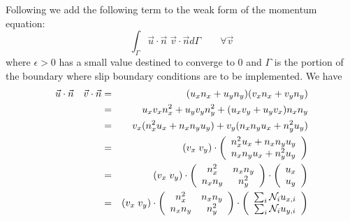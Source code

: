 Following \textcite{diur15} we add the following term to the weak form 
of the momentum equation:
\[
\int_\Gamma \vec{u}\cdot \vec{n} \; \vec{v}  \cdot \vec{n} d\Gamma  \qquad \forall \vec{v}
\]
where $\epsilon >0$ has a small value destined to converge to 0 and 
$\Gamma$ is the portion of the boundary where slip boundary conditions are to 
be implemented.
We have
\begin{eqnarray}
\vec{u}\cdot \vec{n} \quad \vec{v}  \cdot \vec{n} 
&=& (u_x n_x + u_y n_y) (v_x n_x+v_y n_y)  \\
&=& u_xv_x n_x^2 + u_y v_y n_y^2 + (u_xv_y +u_yv_x) n_x n_y  \\
&=& v_x(n_x^2 u_x + n_xn_y u_y) + v_y (n_xn_y u_x + n_y^2 u_y) \\
&=& (v_x \; v_y) \cdot
\left(
\begin{array}{c}
n_x^2 u_x + n_xn_y u_y\\
n_xn_y u_x + n_y^2 u_y
\end{array}
\right) \\
&=& 
(v_x \; v_y)
\cdot
\left(
\begin{array}{cc}
n_x^2 & n_xn_y \\
n_xn_y & n_y^2
\end{array}
\right)
\cdot
\left(
\begin{array}{c}
u_x \\ u_y
\end{array}
\right)\\
&=& 
(v_x \; v_y)
\cdot
\left(
\begin{array}{cc}
n_x^2 & n_xn_y \\
n_xn_y & n_y^2
\end{array}
\right)
\cdot
\left(
\begin{array}{c}
\sum_i {\mathcal{N}}_i u_{x,i} \\ \sum _i {\mathcal{N}}_i u_{y,i}
\end{array}
\right)\\
\end{eqnarray}










